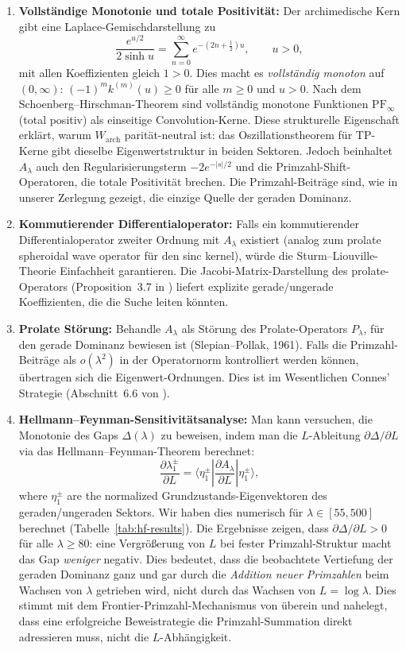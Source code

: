 \documentclass[12pt,a4paper]{article}
\theoremstyle{definition}
\theoremstyle{remark}
\begin{document}
\begin{enumerate}[label=(\Alph*)]
  \item \textbf{Vollständige Monotonie und totale Positivität:} Der archimedische Kern gibt eine Laplace-Gemischdarstellung zu
  \[ \frac{e^{u/2}}{2\sinh u} = \sum_{n=0}^\infty e^{-(2n+\frac{1}{2})u}, \qquad u > 0, \]
  mit allen Koeffizienten gleich $1 > 0$. Dies macht es \emph{vollständig monoton} auf $(0,\infty)$: $(-1)^m k^{(m)}(u) \geq 0$ für alle $m \geq 0$ und $u > 0$. Nach dem Schoenberg--Hirschman-Theorem sind vollständig monotone Funktionen $\mathrm{PF}_\infty$ (total positiv) als einseitige Convolution-Kerne. Diese strukturelle Eigenschaft erklärt, warum $W_{\mathrm{arch}}$ parität-neutral ist: das Oszillationstheorem für TP-Kerne gibt dieselbe Eigenwertstruktur in beiden Sektoren. Jedoch beinhaltet $A_\lambda$ auch den Regularisierungsterm $-2e^{-|s|/2}$ und die Primzahl-Shift-Operatoren, die totale Positivität brechen. Die Primzahl-Beiträge sind, wie in unserer Zerlegung gezeigt, die einzige Quelle der geraden Dominanz.

  \item \textbf{Kommutierender Differentialoperator:} Falls ein kommutierender Differentialoperator zweiter Ordnung mit $A_\lambda$ existiert (analog zum prolate spheroidal wave operator für den sinc kernel), würde die Sturm--Liouville-Theorie Einfachheit garantieren. Die Jacobi-Matrix-Darstellung des prolate-Operators (Proposition~3.7 in \cite{ConnesMoscovici2023}) liefert explizite gerade/ungerade Koeffizienten, die die Suche leiten könnten.

  \item \textbf{Prolate Störung:} Behandle $A_\lambda$ als Störung des Prolate-Operators $P_\lambda$, für den gerade Dominanz bewiesen ist (Slepian--Pollak, 1961). Falls die Primzahl-Beiträge als $o(\lambda^2)$ in der Operatornorm kontrolliert werden können, übertragen sich die Eigenwert-Ordnungen. Dies ist im Wesentlichen Connes' Strategie (Abschnitt~6.6 von \cite{Connes2026}).

  \item \textbf{Hellmann--Feynman-Sensitivitätsanalyse:} Man kann versuchen, die Monotonie des Gaps $\Delta(\lambda)$ zu beweisen, indem man die $L$-Ableitung $\partial\Delta/\partial L$ via das Hellmann--Feynman-Theorem berechnet:
  \[ \frac{\partial \lambda_1^\pm}{\partial L} = \langle \eta_1^\pm | \frac{\partial A_\lambda}{\partial L} | \eta_1^\pm \rangle, \]
  where $\eta_1^\pm$ are the normalized Grundzustands-Eigenvektoren des geraden/ungeraden Sektors.
  Wir haben dies numerisch für $\lambda \in [55, 500]$ berechnet (Tabelle~\ref{tab:hf-results}). Die Ergebnisse zeigen, dass $\partial\Delta/\partial L > 0$ für alle $\lambda \geq 80$: eine Vergrößerung von $L$ bei fester Primzahl-Struktur macht das Gap \emph{weniger} negativ. Dies bedeutet, dass die beobachtete Vertiefung der geraden Dominanz ganz und gar durch die \emph{Addition neuer Primzahlen} beim Wachsen von $\lambda$ getrieben wird, nicht durch das Wachsen von $L = \log\lambda$. Dies stimmt mit dem Frontier-Primzahl-Mechanismus von  überein und nahelegt, dass eine erfolgreiche Beweistrategie die Primzahl-Summation direkt adressieren muss, nicht die $L$-Abhängigkeit.
\end{enumerate}
\end{document}
